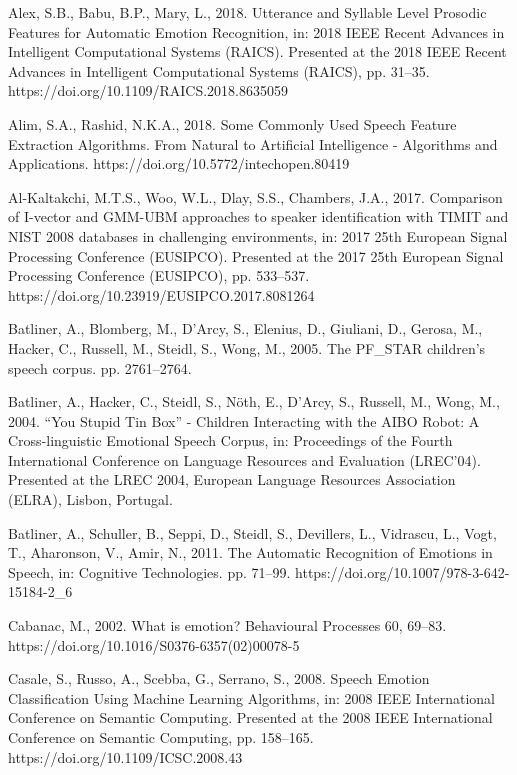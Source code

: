 \setlength{\parindent}{0cm}
\small
\hangindent=0.5cm
 Alex, S.B., Babu, B.P., Mary, L., 2018. Utterance and Syllable Level Prosodic Features for Automatic Emotion Recognition, in: 2018 IEEE Recent Advances in Intelligent Computational Systems (RAICS). Presented at the 2018 IEEE Recent Advances in Intelligent Computational Systems (RAICS), pp. 31–35. https://doi.org/10.1109/RAICS.2018.8635059

\small
\hangindent=0.5cm
 Alim, S.A., Rashid, N.K.A., 2018. Some Commonly Used Speech Feature Extraction Algorithms. From Natural to Artificial Intelligence - Algorithms and Applications. https://doi.org/10.5772/intechopen.80419

\small
\hangindent=0.5cm
 Al-Kaltakchi, M.T.S., Woo, W.L., Dlay, S.S., Chambers, J.A., 2017. Comparison of I-vector and GMM-UBM approaches to speaker identification with TIMIT and NIST 2008 databases in challenging environments, in: 2017 25th European Signal Processing Conference (EUSIPCO). Presented at the 2017 25th European Signal Processing Conference (EUSIPCO), pp. 533–537. \\https://doi.org/10.23919/EUSIPCO.2017.8081264

\small
\hangindent=0.5cm
Batliner, A., Blomberg, M., D’Arcy, S., Elenius, D., Giuliani, D., Gerosa, M., Hacker, C., Russell, M., Steidl, S., Wong, M., 2005. The PF\_STAR children’s speech corpus. pp. 2761–2764.

\small
\hangindent=0.5cm
 Batliner, A., Hacker, C., Steidl, S., Nöth, E., D’Arcy, S., Russell, M., Wong, M., 2004. “You Stupid Tin Box” - Children Interacting with the AIBO Robot: A Cross-linguistic Emotional Speech Corpus, in: Proceedings of the Fourth International Conference on Language Resources and Evaluation (LREC’04). Presented at the LREC 2004, European Language Resources Association (ELRA), Lisbon, Portugal.

\small
\hangindent=0.5cm
Batliner, A., Schuller, B., Seppi, D., Steidl, S., Devillers, L., Vidrascu, L., Vogt, T., Aharonson, V., Amir, N., 2011. The Automatic Recognition of Emotions in Speech, in: Cognitive Technologies. pp. 71–99. https://doi.org/10.1007/978-3-642-15184-2\_6

\small
\hangindent=0.5cm
Cabanac, M., 2002. What is emotion? Behavioural Processes 60, 69–83. \\https://doi.org/10.1016/S0376-6357(02)00078-5

\small
\hangindent=0.5cm
Casale, S., Russo, A., Scebba, G., Serrano, S., 2008. Speech Emotion Classification Using Machine Learning Algorithms, in: 2008 IEEE International Conference on Semantic Computing. Presented at the 2008 IEEE International Conference on Semantic Computing, pp. 158–165. \\https://doi.org/10.1109/ICSC.2008.43

